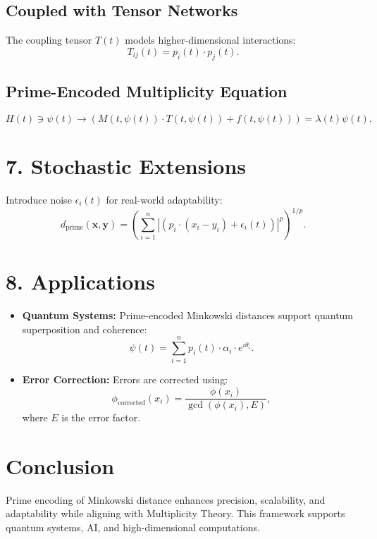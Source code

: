 \documentclass{article}
\theoremstyle{plain}
\begin{document}
\subsection*{Coupled with Tensor Networks}
The coupling tensor \( T(t) \) models higher-dimensional interactions:
\begin{equation}
T_{ij}(t) = p_i(t) \cdot p_j(t).
\end{equation}

\subsection*{Prime-Encoded Multiplicity Equation}
\begin{equation}
H(t) \ni \psi(t) \to \left( M(t, \psi(t)) \cdot T(t, \psi(t)) + f(t, \psi(t)) \right) = \lambda(t) \psi(t).
\end{equation}

\section*{7. Stochastic Extensions}
Introduce noise \( \epsilon_i(t) \) for real-world adaptability:
\begin{equation}
d_{\text{prime}}(\mathbf{x}, \mathbf{y}) = \left( \sum_{i=1}^n |(p_i \cdot (x_i - y_i) + \epsilon_i(t))|^p \right)^{1/p}.
\end{equation}

\section*{8. Applications}
\begin{itemize}
    \item \textbf{Quantum Systems:} Prime-encoded Minkowski distances support quantum superposition and coherence:
    \begin{equation}
    \psi(t) = \sum_{i=1}^n p_i(t) \cdot \alpha_i \cdot e^{i \theta_i}.
    \end{equation}
    \item \textbf{Error Correction:} Errors are corrected using:
    \begin{equation}
    \phi_{\text{corrected}}(x_i) = \frac{\phi(x_i)}{\gcd(\phi(x_i), E)},
    \end{equation}
    where \( E \) is the error factor.
\end{itemize}

\section*{Conclusion}
Prime encoding of Minkowski distance enhances precision, scalability, and adaptability while aligning with Multiplicity Theory. This framework supports quantum systems, AI, and high-dimensional computations.
\end{document}
